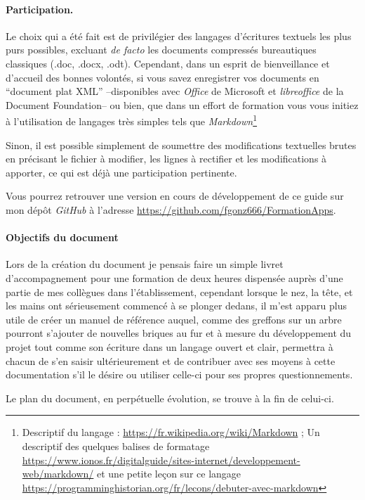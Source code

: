 \paragraph{Participation.}
Le choix qui a été fait est de privilégier des langages d'écritures textuels les plus purs possibles, excluant \emph{de facto\/} les documents compressés bureautiques classiques (.doc, .docx, .odt). 
Cependant, dans un esprit de bienveillance et d'accueil des bonnes volontés, si vous savez enregistrer vos documents en ``document plat XML'' --disponibles avec \emph{Office} de Microsoft et \emph{libreoffice} de la Document Foundation-- ou bien, que dans un effort de formation vous vous initiez à l'utilisation de langages très simples tels que \emph{Markdown}\footnote{%
Descriptif du langage : \url{https://fr.wikipedia.org/wiki/Markdown} ; Un descriptif des quelques balises de formatage \url{https://www.ionos.fr/digitalguide/sites-internet/developpement-web/markdown/} et une petite leçon sur ce langage \url{https://programminghistorian.org/fr/lecons/debuter-avec-markdown}
}

Sinon, il est possible simplement de soumettre des modifications textuelles brutes en précisant le fichier à modifier, les lignes à rectifier et les modifications à apporter, ce qui est déjà une participation pertinente.

Vous pourrez retrouver une version en cours de développement de ce guide sur mon dépôt \emph{GitHub} à l'adresse \url{https://github.com/fgonz666/FormationApps}.



\paragraph{Objectifs du document} 
Lors de la création du document je pensais faire un simple livret d'accompagnement pour une formation de deux heures dispensée auprès d'une partie de mes collègues dans l'établissement, cependant lorsque le nez, la tête, et les mains ont sérieusement commencé à se plonger dedans, il m'est apparu plus utile de créer un manuel de référence auquel, comme des greffons sur un arbre pourront s'ajouter de nouvelles briques au fur et à mesure du développement du projet tout comme son écriture dans un langage ouvert et clair, permettra à chacun de s'en saisir ultérieurement et de contribuer avec ses moyens à cette documentation s'il le désire ou utiliser celle-ci pour ses propres questionnements.

%
Le plan du document, en perpétuelle évolution, se trouve à la fin de celui-ci.